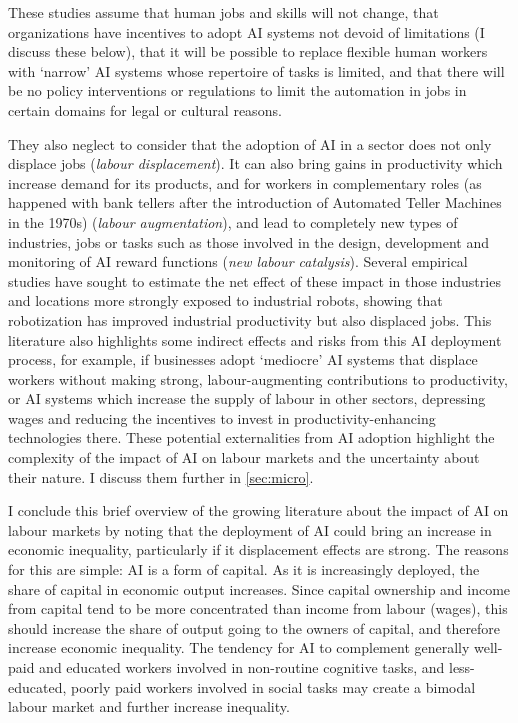 \documentclass[11pt]{article}
\begin{document}
These studies assume that human jobs and skills will not change, that organizations have incentives to adopt AI systems not devoid of limitations (I discuss these below), that it will be possible to replace flexible human workers with `narrow' AI systems whose repertoire of tasks is limited, and that there will be no policy interventions or regulations to limit the automation in jobs in certain domains for legal or cultural reasons. 

They also neglect to consider that the adoption of AI in a sector does not only displace jobs (\textit{labour displacement}). It can also bring gains in productivity which increase demand for its products, and for workers in complementary roles (as happened with bank tellers after the introduction of Automated Teller Machines in the 1970s) (\textit{labour augmentation}), and lead to completely new types of industries, jobs or tasks such as those involved in the design, development and monitoring of AI reward functions (\textit{new labour catalysis}). Several empirical studies have sought to estimate the net effect of these impact in those industries and locations more strongly exposed to industrial robots, showing that robotization has improved industrial productivity but also displaced jobs. This literature also highlights some indirect effects and risks from this AI deployment process, for example, if businesses adopt `mediocre' AI systems that displace workers without making strong, labour-augmenting contributions to productivity, or AI systems which increase the supply of labour in other sectors, depressing wages and reducing the incentives to invest in productivity-enhancing technologies there. These potential externalities from AI adoption highlight the complexity of the impact of AI on labour markets and the uncertainty about their nature. I discuss them further in \ref{sec:micro}.

I conclude this brief overview of the growing literature about the impact of AI on labour markets by noting that the deployment of AI could bring an increase in economic inequality, particularly if it displacement effects are strong. The reasons for this are simple: AI is a form of capital. As it is increasingly deployed, the share of capital in economic output increases. Since capital ownership and income from capital tend to be more concentrated than income from labour (wages), this should increase the share of output going to the owners of capital, and therefore increase economic inequality. The tendency for AI to complement generally well-paid and educated workers involved in non-routine cognitive tasks, and less-educated, poorly paid workers involved in social tasks may create a bimodal labour market and further increase inequality.
\end{document}
